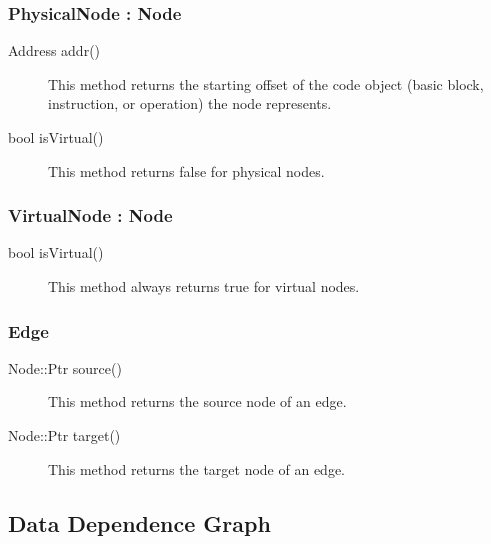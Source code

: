 \documentclass[12pt,titlepage]{article}
\begin{document}
\subsubsection{PhysicalNode : Node}
\begin{description}
\item[Address addr()] This method returns the starting
offset of the code object (basic block, instruction, or operation) the
node represents.
\item[bool isVirtual()] This method returns false for physical nodes.
\end{description}

\subsubsection{VirtualNode : Node}
\begin{description}
\item[bool isVirtual()]
This method always returns true for virtual nodes.
\end{description}

\subsubsection{Edge}
\begin{description}
\item[Node::Ptr source()]
This method returns the source node of an edge.
\item[Node::Ptr target() ]
This method returns the target node of an edge.
\end{description}

\subsection{Data Dependence Graph}
\end{document}
